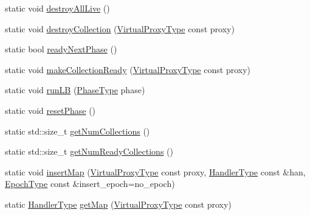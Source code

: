 \begin{DoxyCompactItemize}
\item 
static void \hyperlink{structvt_1_1vrt_1_1collection_1_1_universal_index_holder_a4403caeab7e7cc22ec0bfcf18c212e1e}{destroy\+All\+Live} ()
\item 
static void \hyperlink{structvt_1_1vrt_1_1collection_1_1_universal_index_holder_aca1584759cadbda74eb8c499c73a63e3}{destroy\+Collection} (\hyperlink{namespacevt_a1b417dd5d684f045bb58a0ede70045ac}{Virtual\+Proxy\+Type} const proxy)
\item 
static bool \hyperlink{structvt_1_1vrt_1_1collection_1_1_universal_index_holder_a65d66cf04f636d3417aa335a2b8a1e0a}{ready\+Next\+Phase} ()
\item 
static void \hyperlink{structvt_1_1vrt_1_1collection_1_1_universal_index_holder_a27071becb7e0c0d149d1c7aaa47f8d7d}{make\+Collection\+Ready} (\hyperlink{namespacevt_a1b417dd5d684f045bb58a0ede70045ac}{Virtual\+Proxy\+Type} const proxy)
\item 
static void \hyperlink{structvt_1_1vrt_1_1collection_1_1_universal_index_holder_a1e64a480289dc1e9f86f851d9f3a927f}{run\+LB} (\hyperlink{namespacevt_a46ce6733d5cdbd735d561b7b4029f6d7}{Phase\+Type} phase)
\item 
static void \hyperlink{structvt_1_1vrt_1_1collection_1_1_universal_index_holder_a58c6c00fec5e45cf9e8a1a8a66a35234}{reset\+Phase} ()
\item 
static std\+::size\+\_\+t \hyperlink{structvt_1_1vrt_1_1collection_1_1_universal_index_holder_a7c8679e3a346a67497402ece0bdd76a8}{get\+Num\+Collections} ()
\item 
static std\+::size\+\_\+t \hyperlink{structvt_1_1vrt_1_1collection_1_1_universal_index_holder_ae3fa7137bc9d8cce167905297b20841c}{get\+Num\+Ready\+Collections} ()
\item 
static void \hyperlink{structvt_1_1vrt_1_1collection_1_1_universal_index_holder_a6da9bb8383de73588d8b8379dcab22e4}{insert\+Map} (\hyperlink{namespacevt_a1b417dd5d684f045bb58a0ede70045ac}{Virtual\+Proxy\+Type} const proxy, \hyperlink{namespacevt_af64846b57dfcaf104da3ef6967917573}{Handler\+Type} const \&han, \hyperlink{namespacevt_a985a5adf291c34a3ca263b3378388236}{Epoch\+Type} const \&insert\+\_\+epoch=no\+\_\+epoch)
\item 
static \hyperlink{namespacevt_af64846b57dfcaf104da3ef6967917573}{Handler\+Type} \hyperlink{structvt_1_1vrt_1_1collection_1_1_universal_index_holder_aeff5de464c1477e78b8049a7fbec1046}{get\+Map} (\hyperlink{namespacevt_a1b417dd5d684f045bb58a0ede70045ac}{Virtual\+Proxy\+Type} const proxy)

\end{DoxyCompactItemize}
